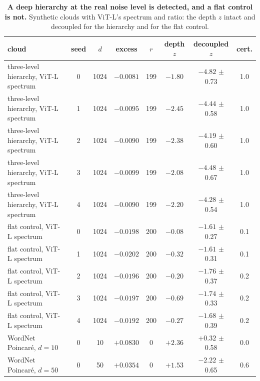 \begin{table}[H]
\centering
\scriptsize
\setlength{\tabcolsep}{2pt}
\begingroup
\footnotesize
\setlength{\tabcolsep}{4pt}
\begin{tabular}{lccccccc}
\toprule
cloud & seed & $d$ & excess & $r$ & depth $z$ & decoupled $z$ & cert. \\
\midrule
three-level hierarchy, ViT-L spectrum & 0 & 1024 & $-0.0081$ & 199 & $-1.80$ & $-4.82$ $\pm$ 0.73 & 1.0 \\
three-level hierarchy, ViT-L spectrum & 1 & 1024 & $-0.0095$ & 199 & $-2.45$ & $-4.44$ $\pm$ 0.58 & 1.0 \\
three-level hierarchy, ViT-L spectrum & 2 & 1024 & $-0.0090$ & 199 & $-2.38$ & $-4.19$ $\pm$ 0.60 & 1.0 \\
three-level hierarchy, ViT-L spectrum & 3 & 1024 & $-0.0099$ & 199 & $-2.08$ & $-4.48$ $\pm$ 0.67 & 1.0 \\
three-level hierarchy, ViT-L spectrum & 4 & 1024 & $-0.0090$ & 199 & $-2.20$ & $-4.28$ $\pm$ 0.54 & 1.0 \\
\midrule
flat control, ViT-L spectrum & 0 & 1024 & $-0.0198$ & 200 & $-0.08$ & $-1.61$ $\pm$ 0.27 & 0.1 \\
flat control, ViT-L spectrum & 1 & 1024 & $-0.0202$ & 200 & $-0.32$ & $-1.61$ $\pm$ 0.31 & 0.1 \\
flat control, ViT-L spectrum & 2 & 1024 & $-0.0196$ & 200 & $-0.20$ & $-1.76$ $\pm$ 0.37 & 0.2 \\
flat control, ViT-L spectrum & 3 & 1024 & $-0.0197$ & 200 & $-0.69$ & $-1.74$ $\pm$ 0.33 & 0.2 \\
flat control, ViT-L spectrum & 4 & 1024 & $-0.0192$ & 200 & $-0.27$ & $-1.68$ $\pm$ 0.39 & 0.2 \\
\midrule
WordNet Poincar\'e, $d{=}10$ & 0 & 10 & $+0.0830$ & 0 & $+2.36$ & $+0.32$ $\pm$ 0.58 & 0.0 \\
WordNet Poincar\'e, $d{=}50$ & 0 & 50 & $+0.0354$ & 0 & $+1.53$ & $-2.22$ $\pm$ 0.65 & 0.6 \\
\bottomrule
\end{tabular}
\par\vspace{2pt}
\endgroup
\caption{\textbf{A deep hierarchy at the real noise level is detected, and a flat control is not.} Synthetic clouds with ViT-L's spectrum and ratio: the depth $z$ intact and decoupled for the hierarchy and for the flat control.
}
\label{tab:q5-power}\label{tab:q5-power-d}
\end{table}
